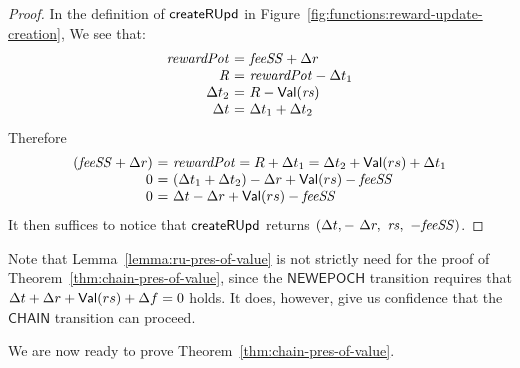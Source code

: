 \begin{proof}
  In the definition of $\mathsf{createRUpd}$ in Figure~\ref{fig:functions:reward-update-creation},
  We see that:
  \begin{equation*}
    \begin{array}{r@{~=~}l}
      \var{rewardPot} & \var{feeSS} + \Delta r \\
      \var{R} & \var{rewardPot} - \Delta t_1 \\
      \Delta t_2 & R - \Val(\var{rs})\\
      \Delta t & \Delta t_1 + \Delta t_2 \\
    \end{array}
  \end{equation*}
  Therefore
  \begin{equation*}
    \begin{array}{r@{~=~}l}
      (\var{feeSS} + \Delta r) & \var{rewardPot} = R + \Delta t_1 = \Delta t_2 + \Val(rs) + \Delta t_1  \\
      0 & (\Delta t_1 + \Delta t_2 ) - \Delta r + \Val(rs)- \var{feeSS} \\
      0 & \Delta t - \Delta r + \Val(rs)- \var{feeSS} \\
    \end{array}
  \end{equation*}
  It then suffices to notice that $\mathsf{createRUpd}$ returns
  $(\Delta t,-~\Delta r,~\mathit{rs},~-\mathit{feeSS})$.
\end{proof}

\noindent

Note that Lemma~\ref{lemma:ru-pres-of-value} is not strictly need for the proof of
Theorem~\ref{thm:chain-pres-of-value}, since the $\mathsf{NEWEPOCH}$ transition
requires that $\Delta t + \Delta r + \mathsf{Val}(rs) + \Delta f = 0$ holds.
It does, however, give us confidence that the $\mathsf{CHAIN}$ transition can proceed.

We are now ready to prove Theorem~\ref{thm:chain-pres-of-value}.

